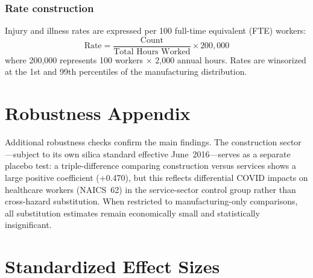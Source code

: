 \documentclass[12pt]{article}
\begin{document}
\subsubsection*{Rate construction}
Injury and illness rates are expressed per 100 full-time equivalent (FTE) workers:
\[
\text{Rate} = \frac{\text{Count}}{\text{Total Hours Worked}} \times 200{,}000
\]
where 200,000 represents 100 workers $\times$ 2,000 annual hours. Rates are winsorized at the 1st and 99th percentiles of the manufacturing distribution.


\section{Robustness Appendix}
\label{app:robustness}

Additional robustness checks confirm the main findings. The construction sector---subject to its own silica standard effective June~2016---serves as a separate placebo test: a triple-difference comparing construction versus services shows a large positive coefficient (+0.470), but this reflects differential COVID impacts on healthcare workers (NAICS~62) in the service-sector control group rather than cross-hazard substitution. When restricted to manufacturing-only comparisons, all substitution estimates remain economically small and statistically insignificant.


\section{Standardized Effect Sizes}
\label{sec:sde}


\end{document}
